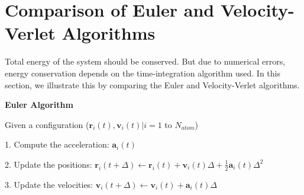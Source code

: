 \documentclass[11pt, oneside]{article}   	%
\begin{document}
\section{Comparison of Euler and Velocity-Verlet Algorithms}
\vspace{-2ex} Total energy of the system should be conserved. But due to numerical errors, energy conservation depends on the time-integration algorithm used. In this section, we illustrate this by comparing the Euler and Velocity-Verlet algorithms.
 
\begin{framed}
	\textbf{Euler Algorithm}
	
	Given a configuration ($\boldsymbol{r}_i(t), \boldsymbol{v}_i(t) | i = 1$ to $N_{atom}$)
	
	1. Compute the acceleration: $\boldsymbol{a}_i(t)$
	
	2. Update the positions: $\boldsymbol{r}_i(t + \Delta) \leftarrow \boldsymbol{r}_i(t) + \boldsymbol{v}_i(t) \Delta + \frac{1}{2}\boldsymbol{a}_i(t) \Delta^2$
	
	3. Update the velocities: $\boldsymbol{v}_i(t + \Delta) \leftarrow \boldsymbol{v}_i(t) + \boldsymbol{a}_i(t) \Delta $
\end{framed}
\end{document}
